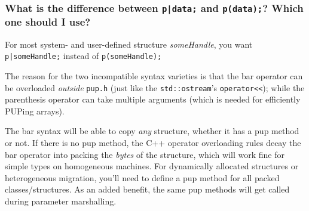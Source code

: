 \subsubsection{What is the difference between {\tt p|data;} and
{\tt p(data);}? Which one should I use?}

For most system- and user-defined structure {\em someHandle}, you want
{\tt p|someHandle;} instead of {\tt p(someHandle);}

The reason for the two incompatible syntax varieties is that the bar
operator can be overloaded {\em outside} {\tt pup.h} (just like the
{\tt std::ostream}'s {\tt operator{<}<});
while the parenthesis operator can take multiple arguments (which is needed
for efficiently PUPing arrays).

The bar syntax will be able to copy {\em any} structure, whether it
has a pup method or not. If there is no pup method, the C++ operator overloading
rules decay the bar operator into packing the {\em bytes} of the structure,
which will work fine for simple types on homogeneous machines. For dynamically
allocated structures or heterogeneous migration, you'll need to define
a pup method for all packed classes/structures. As an added benefit, the
same pup methods will get called during parameter marshalling.
